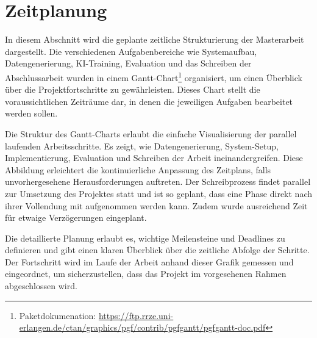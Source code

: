 
\section{Zeitplanung}
\label{sec:zeitplanung}

In diesem Abschnitt wird die geplante zeitliche Strukturierung der Masterarbeit dargestellt. Die verschiedenen Aufgabenbereiche wie Systemaufbau, Datengenerierung, KI-Training, Evaluation und das Schreiben der Abschlussarbeit wurden in einem Gantt-Chart\footnote{Paketdokumenation: \url{https://ftp.rrze.uni-erlangen.de/ctan/graphics/pgf/contrib/pgfgantt/pgfgantt-doc.pdf}} organisiert, um einen Überblick über die Projektfortschritte zu gewährleisten. Dieses Chart stellt die voraussichtlichen Zeiträume dar, in denen die jeweiligen Aufgaben bearbeitet werden sollen.

Die Struktur des Gantt-Charts erlaubt die einfache Visualisierung der parallel laufenden Arbeitsschritte. Es zeigt, wie Datengenerierung, System-Setup, Implementierung, Evaluation und Schreiben der Arbeit ineinandergreifen. Diese Abbildung erleichtert die kontinuierliche Anpassung des Zeitplans, falls unvorhergesehene Herausforderungen auftreten. Der Schreibprozess findet parallel zur Umsetzung des Projektes statt und ist so geplant, dass eine Phase direkt nach ihrer Vollendung mit aufgenommen werden kann. Zudem wurde ausreichend Zeit für etwaige Verzögerungen eingeplant.

Die detaillierte Planung erlaubt es, wichtige Meilensteine und Deadlines zu definieren und gibt einen klaren Überblick über die zeitliche Abfolge der Schritte. Der Fortschritt wird im Laufe der Arbeit anhand dieser Grafik gemessen und eingeordnet, um sicherzustellen, dass das Projekt im vorgesehenen Rahmen abgeschlossen wird.


